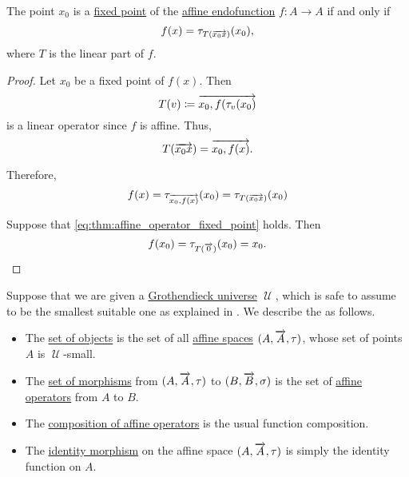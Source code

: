 \begin{proposition}\label{thm:affine_operator_fixed_point}
  The point \( x_0 \) is a \hyperref[def:fixed_point]{fixed point} of the \hyperref[def:affine_operator]{affine endofunction} \( f: A \to A \) if and only if
  \begin{equation}\label{eq:thm:affine_operator_fixed_point}
    f(x) = \tau_{T(\overrightarrow{x_0 x})}(x_0),
  \end{equation}
  where \( T \) is the linear part of \( f \).
\end{proposition}
\begin{proof}
  \SufficiencySubProof Let \( x_0 \) be a fixed point of \( f(x) \). Then
  \begin{equation*}
    T(v) \coloneqq \overrightarrow{x_0,f(\tau_v(x_0)}
  \end{equation*}
  is a linear operator since \( f \) is affine. Thus,
  \begin{equation*}
    T(\overrightarrow{x_0 x}) = \overrightarrow{x_0,f(x)}.
  \end{equation*}

  Therefore,
  \begin{equation*}
    f(x) = \tau_{\overrightarrow{x_0,f(x)}}(x_0) = \tau_{T(\overrightarrow{x_0 x})}(x_0)
  \end{equation*}

  \NecessitySubProof Suppose that \eqref{eq:thm:affine_operator_fixed_point} holds. Then
  \begin{equation*}
    f(x_0) = \tau_{T(\overrightarrow{0})}(x_0) = x_0.
  \end{equation*}
\end{proof}

\begin{definition}\label{def:category_of_small_affine_spaces}
  Suppose that we are given a \hyperref[def:grothendieck_universe]{Grothendieck universe} \( \mscrU \), which is safe to assume to be the smallest suitable one as explained in . We describe the  as follows.

  \begin{itemize}
    \item The \hyperref[def:category/objects]{set of objects} is the set of all \hyperref[def:affine_space]{affine spaces} \( (A, \overrightarrow{A}, \tau) \), whose set of points \( A \) is \( \mscrU \)-small.

    \item The \hyperref[def:category/morphisms]{set of morphisms} from \( (A, \overrightarrow{A}, \tau) \) to \( (B, \overrightarrow{B}, \sigma) \) is the set of \hyperref[def:affine_operator]{affine operators} from \( A \) to \( B \).

    \item The \hyperref[def:category/composition]{composition of affine operators} is the usual function composition.

    \item The \hyperref[def:category/identity]{identity morphism} on the affine space \( (A, \overrightarrow{A}, \tau) \) is simply the identity function on \( A \).
  \end{itemize}
\end{definition}

